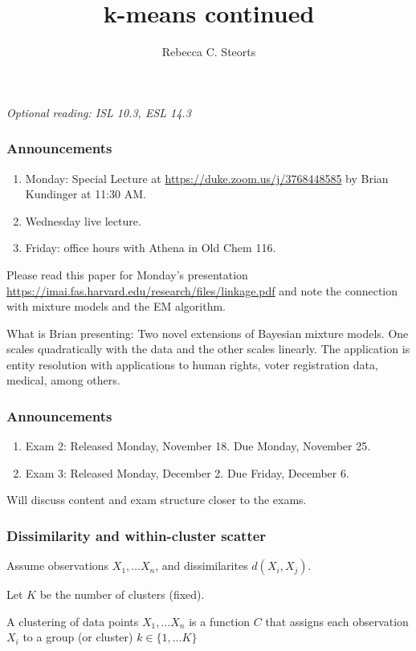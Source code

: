 \documentclass[mathserif]{beamer}
\def\R{\mathds{R}}
\def\blue{\color[rgb]{0,0,0.8}}
\begin{document}
\title{k-means continued}
\author{Rebecca C. Steorts}
\begin{frame}
\titlepage
{\it Optional reading: ISL 10.3, ESL 14.3}
\end{frame}

\begin{frame}
\frametitle{Announcements}
\begin{enumerate}
\item Monday: Special Lecture at \url{https://duke.zoom.us/j/3768448585} by Brian Kundinger at 11:30 AM.
\item Wednesday live lecture.
\item Friday: office hours with Athena in Old Chem 116. 
\end{enumerate}
\vspace*{1em}
Please read this paper for Monday's presentation \url{https://imai.fas.harvard.edu/research/files/linkage.pdf} and note the connection with mixture models and the EM algorithm. 

\vspace*{1em}
What is Brian presenting: Two novel extensions of Bayesian mixture models. One scales quadratically with the data and the other scales linearly. The application is entity resolution with applications to human rights, voter registration data, medical, among others.
\end{frame}

\begin{frame}
\frametitle{Announcements}
\begin{enumerate}
\item Exam 2: Released Monday, November 18. Due Monday, November 25.
\item Exam 3: Released Monday, December 2. Due Friday, December 6. 
\end{enumerate}

\vspace*{1em}
Will discuss content and exam structure closer to the exams.


\end{frame}

\begin{frame}
\frametitle{Dissimilarity and within-cluster scatter}

Assume observations $X_1,\ldots X_n$, and 
{\blue dissimilarites} $d(X_i,X_j)$.
\bigskip


Let $K$ be the {\blue number of clusters} (fixed).
\bigskip

A {\blue clustering} of data points
$X_1,\ldots X_n$ is a function $C$ that
assigns each observation $X_i$ to a group (or cluster) $k \in \{1,\ldots K\}$
\end{frame}
\end{document}

